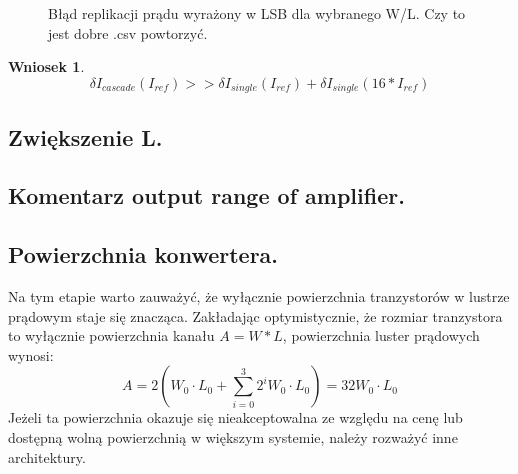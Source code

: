 \documentclass[10pt,a4paper]{report}
\theoremstyle{definition}
\theoremstyle{definition}
\theoremstyle{definition}
\theoremstyle{definition}
\theoremstyle{definition}
\newtheorem{wniosek}{Wniosek}[section]
\begin{document}
	
	\begin{figure}[!htb]
		\centering
		\caption{Błąd replikacji prądu wyrażony w LSB dla wybranego W/L. Czy to jest dobre .csv powtorzyć.}
	\end{figure}
	
	\begin{wniosek}{}
		\begin{equation}
			\delta I_{cascade}(I_{ref}) >> \delta I_{single}(I_{ref}) + \delta I_{single}(16*I_{ref}) 
		\end{equation}
	\end{wniosek}

	\subsection{Zwiększenie L.}
	
	\subsection{Komentarz output range of amplifier.}
	
	\subsection{Powierzchnia konwertera.}
	{	Na tym etapie warto zauważyć, że wyłącznie powierzchnia tranzystorów w lustrze prądowym staje się znacząca. Zakładając optymistycznie, że rozmiar tranzystora to wyłącznie powierzchnia kanału $A=W*L$, powierzchnia luster prądowych wynosi:
	\begin{equation}
		A = 2 \left( W_0 \cdot L_0 + \sum_{i=0}^{3}2^i W_0 \cdot L_0 \right) = 32 W_0 \cdot L_0
	\end{equation}
	Jeżeli ta powierzchnia okazuje się nieakceptowalna ze względu na cenę lub dostępną wolną powierzchnią w większym systemie, należy rozważyć inne architektury.
	}
	
\end{document}
